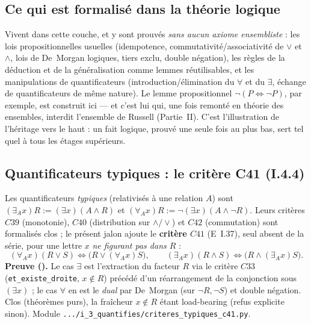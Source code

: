 \subsection{Ce qui est formalisé dans la théorie logique}

Vivent dans cette couche, et y sont prouvés \emph{sans aucun axiome ensembliste} :
les lois propositionnelles usuelles (idempotence, commutativité/associativité
de $\vee$ et $\wedge$, lois de De~Morgan logiques, tiers exclu, double
négation), les règles de la déduction et de la généralisation comme lemmes
réutilisables, et les manipulations de quantificateurs (introduction/élimination
du $\forall$ et du $\exists$, échange de quantificateurs de même nature). Le
lemme propositionnel $\neg(P\Leftrightarrow\neg P)$, par exemple, est construit
ici --- et c'est lui qui, une fois remonté en théorie des ensembles, interdit
l'ensemble de Russell (Partie~II). C'est l'illustration de l'héritage vers le
haut : un fait logique, prouvé une seule fois au plus bas, sert tel quel à tous
les étages supérieurs.

\subsection{Quantificateurs typiques : le critère C41 (I.4.4)}
Les quantificateurs \emph{typiques} (relativisés à une relation $A$) sont
$(\exists_A x)R:=(\exists x)(A\wedge R)$ et $(\forall_A x)R:=\neg(\exists x)(A\wedge\neg R)$.
Leurs critères $C39$ (monotonie), $C40$ (distribution sur $\wedge/\vee$) et $C42$
(commutation) sont formalisés clos ; le présent jalon ajoute le \textbf{critère
$C41$} (E~I.37), seul absent de la série, pour une lettre $x$ \emph{ne figurant pas
dans $R$} :
\[
  (\forall_A x)(R\vee S)\Leftrightarrow\bigl(R\vee(\forall_A x)S\bigr),\qquad
  (\exists_A x)(R\wedge S)\Leftrightarrow\bigl(R\wedge(\exists_A x)S\bigr).
\]
\textbf{Preuve (\Nstar).} Le cas $\exists$ est l'extraction du facteur $R$ via le
critère $C33$ (\texttt{et\_existe\_droite}, $x\notin R$) précédé d'un réarrangement
de la conjonction sous $(\exists x)$ ; le cas $\forall$ en est le \emph{dual} par
De~Morgan (sur $\neg R,\neg S$) et double négation. Clos (théorèmes purs), la
fraîcheur $x\notin R$ étant load-bearing (refus explicite sinon). Module
\texttt{.../i\_3\_quantifies/criteres\_typiques\_c41.py}.
